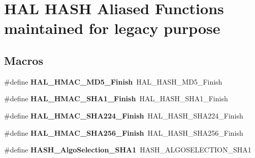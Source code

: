 \hypertarget{group___h_a_l___h_a_s_h___aliased___functions}{}\section{H\+AL H\+A\+SH Aliased Functions maintained for legacy purpose}
\label{group___h_a_l___h_a_s_h___aliased___functions}
\subsection*{Macros}
\begin{DoxyCompactItemize}
\item 
\#define {\bfseries H\+A\+L\+\_\+\+H\+M\+A\+C\+\_\+\+M\+D5\+\_\+\+Finish}~H\+A\+L\+\_\+\+H\+A\+S\+H\+\_\+\+M\+D5\+\_\+\+Finish\hypertarget{group___h_a_l___h_a_s_h___aliased___functions_ga9038c80d41c96129d3cca1d0daefc98b}{}\label{group___h_a_l___h_a_s_h___aliased___functions_ga9038c80d41c96129d3cca1d0daefc98b}

\item 
\#define {\bfseries H\+A\+L\+\_\+\+H\+M\+A\+C\+\_\+\+S\+H\+A1\+\_\+\+Finish}~H\+A\+L\+\_\+\+H\+A\+S\+H\+\_\+\+S\+H\+A1\+\_\+\+Finish\hypertarget{group___h_a_l___h_a_s_h___aliased___functions_gaab29ddc3c3ff04d0988b5957d9499fff}{}\label{group___h_a_l___h_a_s_h___aliased___functions_gaab29ddc3c3ff04d0988b5957d9499fff}

\item 
\#define {\bfseries H\+A\+L\+\_\+\+H\+M\+A\+C\+\_\+\+S\+H\+A224\+\_\+\+Finish}~H\+A\+L\+\_\+\+H\+A\+S\+H\+\_\+\+S\+H\+A224\+\_\+\+Finish\hypertarget{group___h_a_l___h_a_s_h___aliased___functions_ga83c74f87944b8f73a11cb5dfa858f25c}{}\label{group___h_a_l___h_a_s_h___aliased___functions_ga83c74f87944b8f73a11cb5dfa858f25c}

\item 
\#define {\bfseries H\+A\+L\+\_\+\+H\+M\+A\+C\+\_\+\+S\+H\+A256\+\_\+\+Finish}~H\+A\+L\+\_\+\+H\+A\+S\+H\+\_\+\+S\+H\+A256\+\_\+\+Finish\hypertarget{group___h_a_l___h_a_s_h___aliased___functions_gaac86fd19acf8548fc6754c19e723d9f7}{}\label{group___h_a_l___h_a_s_h___aliased___functions_gaac86fd19acf8548fc6754c19e723d9f7}

\item 
\#define {\bfseries H\+A\+S\+H\+\_\+\+Algo\+Selection\+\_\+\+S\+H\+A1}~H\+A\+S\+H\+\_\+\+A\+L\+G\+O\+S\+E\+L\+E\+C\+T\+I\+O\+N\+\_\+\+S\+H\+A1\hypertarget{group___h_a_l___h_a_s_h___aliased___functions_gaa866d6ac9e86d2290b012681836f22d0}{}\label{group___h_a_l___h_a_s_h___aliased___functions_gaa866d6ac9e86d2290b012681836f22d0}


\end{DoxyCompactItemize}
